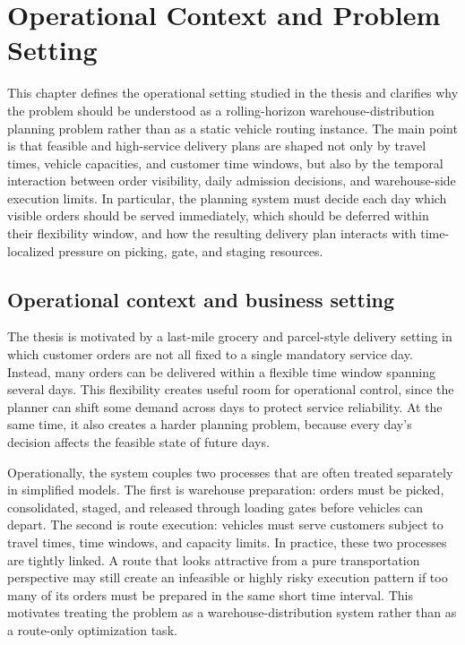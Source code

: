 \chapter{Operational Context and Problem Setting}
\label{ch:operational_context_problem_setting}

This chapter defines the operational setting studied in the thesis and clarifies why the problem should be understood as a rolling-horizon warehouse-distribution planning problem rather than as a static vehicle routing instance. The main point is that feasible and high-service delivery plans are shaped not only by travel times, vehicle capacities, and customer time windows, but also by the temporal interaction between order visibility, daily admission decisions, and warehouse-side execution limits. In particular, the planning system must decide each day which visible orders should be served immediately, which should be deferred within their flexibility window, and how the resulting delivery plan interacts with time-localized pressure on picking, gate, and staging resources.

\section{Operational context and business setting}

The thesis is motivated by a last-mile grocery and parcel-style delivery setting in which customer orders are not all fixed to a single mandatory service day. Instead, many orders can be delivered within a flexible time window spanning several days. This flexibility creates useful room for operational control, since the planner can shift some demand across days to protect service reliability. At the same time, it also creates a harder planning problem, because every day's decision affects the feasible state of future days.

Operationally, the system couples two processes that are often treated separately in simplified models. The first is warehouse preparation: orders must be picked, consolidated, staged, and released through loading gates before vehicles can depart. The second is route execution: vehicles must serve customers subject to travel times, time windows, and capacity limits. In practice, these two processes are tightly linked. A route that looks attractive from a pure transportation perspective may still create an infeasible or highly risky execution pattern if too many of its orders must be prepared in the same short time interval. This motivates treating the problem as a warehouse-distribution system rather than as a route-only optimization task.

